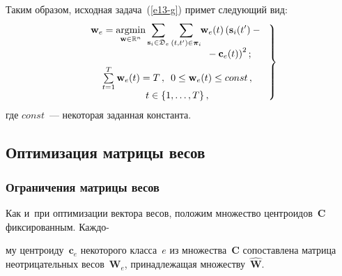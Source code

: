 \begin{multicols}{2}
Таким образом, исходная задача~(\ref{e13-g}) примет следующий вид:
\begin{equation}
\left.
\begin{array}{c}
 \mathbf{w}_e = \mathop{\mathrm{argmin}}\limits_{{\mathbf{w} \in \mathbb{R}^n}}
\displaystyle \sum\limits_{\mathbf{s}_i \in \fD_e}
 \sum\limits_{(t,t') \in \boldsymbol{\pi}_i}\hspace*{-1mm}
 \mathbf{w}_e(t)\left(\mathbf{s}_i(t')-{}\right.\\[6pt]
\left.\hspace*{37mm}{}-\mathbf{c}_e(t)\right)^2;
\\[6pt]
 \sum\limits_{t=1}^T{\mathbf{w}_e(t)} = T\,, 
 \enskip 0 \leq \mathbf{w}_e(t) \leq const\,, \\[6pt] 
 t \in \{1,\ldots,T\}\,,
 \end{array}
 \right\}
  \label{e14-g}
\end{equation}
 где $const$~--- некоторая заданная константа.
 
 \vspace*{-2pt}

\subsection{Оптимизация матрицы весов}


\subsubsection{Ограничения матрицы весов}

Как и~при оптимизации вектора весов, положим множество центроидов~$\mathbf{C}$ 
фиксированным. Каждо-\linebreak\vspace*{-12pt}

\columnbreak

\noindent
му центроиду~$\mathbf{c}_e$ некоторого класса~$e$ 
из множества~$\mathbf{C}$ сопоставлена матрица неотрицательных весов~$\mathbf{W}_e$, 
принадлежащая множеству~$\hat{\mathbf{W}}$.


\end{multicols}
